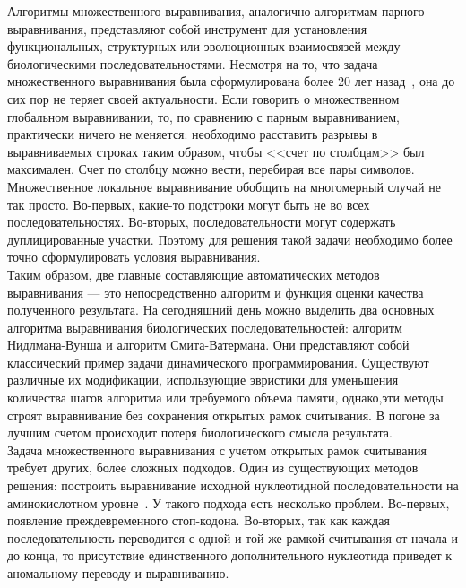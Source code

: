 \indent Алгоритмы множественного выравнивания, аналогично алгоритмам парного выравнивания, представляют собой инструмент для установления функциональных, структурных или эволюционных взаимосвязей между биологическими последовательностями.  Несмотря на то, что задача множественного выравнивания была сформулирована более 20 лет назад~\cite{SIAM_Journal}, она до сих пор не теряет своей актуальности. Если говорить о множественном глобальном выравнивании, то, по сравнению с парным выравниванием, практически ничего не меняется: необходимо расставить разрывы в выравниваемых строках таким образом, чтобы <<счет по столбцам>> был максимален. Счет по столбцу можно вести, перебирая все пары символов. Множественное локальное выравнивание обобщить на многомерный случай не так просто. Во-первых, какие-то подстроки могут быть не во всех последовательностях. Во-вторых, последовательности могут содержать дуплицированные участки. Поэтому для решения такой задачи необходимо более точно сформулировать условия выравнивания.\\ 
\indent Таким образом, две главные составляющие автоматических методов выравнивания --- это непосредственно алгоритм и функция оценки качества полученного результата. На сегодняшний день можно выделить два основных алгоритма выравнивания биологических последовательностей: алгоритм Нидлмана-Вунша и алгоритм Смита-Ватермана. Они представляют собой классический пример задачи динамического программирования. Существуют различные их модификации, использующие эвристики для уменьшения количества шагов алгоритма или требуемого объема памяти, однако,эти методы строят выравнивание без сохранения открытых рамок считывания. В погоне за лучшим счетом происходит потеря биологического смысла результата.\\ 
\indent Задача множественного выравнивания с учетом открытых рамок считывания требует других, более сложных подходов. Один из существующих методов решения: построить выравнивание исходной нуклеотидной последовательности на аминокислотном уровне~\cite{MACSE}. У такого подхода есть несколько проблем. Во-первых, появление преждевременного стоп-кодона. Во-вторых, так как каждая последовательность переводится с одной и той же рамкой считывания от начала и до конца, то присутствие единственного дополнительного нуклеотида приведет к аномальному переводу и выравниванию.